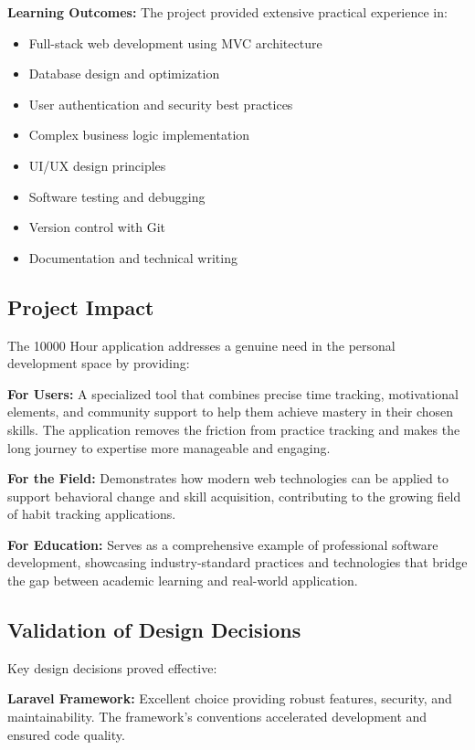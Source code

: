 \documentclass[12pt,a4paper]{report}
\newcommand{\JustifiedNormal}{\fontsize{12}{14}\selectfont\justifying\setlength{\parindent}{0pt}}
\begin{document}
\textbf{Learning Outcomes:} The project provided extensive practical experience in:
\begin{itemize}
  \item Full-stack web development using MVC architecture
  \item Database design and optimization
  \item User authentication and security best practices
  \item Complex business logic implementation
  \item UI/UX design principles
  \item Software testing and debugging
  \item Version control with Git
  \item Documentation and technical writing
\end{itemize}

\subsection{Project Impact}
\JustifiedNormal
The 10000 Hour application addresses a genuine need in the personal development space by providing:

\textbf{For Users:} A specialized tool that combines precise time tracking, motivational elements, and community support to help them achieve mastery in their chosen skills. The application removes the friction from practice tracking and makes the long journey to expertise more manageable and engaging.

\textbf{For the Field:} Demonstrates how modern web technologies can be applied to support behavioral change and skill acquisition, contributing to the growing field of habit tracking applications.

\textbf{For Education:} Serves as a comprehensive example of professional software development, showcasing industry-standard practices and technologies that bridge the gap between academic learning and real-world application.

\subsection{Validation of Design Decisions}
\JustifiedNormal
Key design decisions proved effective:

\textbf{Laravel Framework:} Excellent choice providing robust features, security, and maintainability. The framework's conventions accelerated development and ensured code quality.
\end{document}
